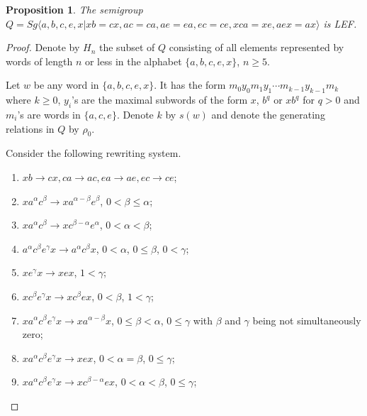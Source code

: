 \documentclass{article}
\newtheorem{proposition}{Proposition}
\theoremstyle{definition}
\begin{document}
\begin{proposition}
The semigroup $Q = Sg \langle a,b,c,e,x | xb = cx, ac = ca, ae=ea, ec=ce, xca = xe, aex = ax\rangle$ is LEF.
\end{proposition}
\begin{proof}
Denote by $H_n$ the subset of $Q$ consisting of all elements represented by words of length $n$ or less in the alphabet $\{a,b,c,e,x\}$, $n \ge 5$.

Let $w$ be any word in $\{a,b,c,e,x\}$. It has the form  $m_0 y_0 m_1 y_1 \cdots m_{k-1} y_{k-1} m_k$ where $k \ge 0$, $y_i$'s are the maximal subwords of the form $x$, $b^q$ or $x b^q$ for $q > 0$ and $m_i$'s are words in $\{a,c,e\}$. Denote $k$ by $s(w)$ and denote the generating relations in $Q$ by $\rho_0$.

Consider the following rewriting system.

\begin{enumerate}
\item $xb \rightarrow cx, ca \rightarrow ac, ea \rightarrow ae, ec \rightarrow ce$;

\item $x a^\alpha c^\beta \rightarrow x a^{\alpha - \beta} e^\beta$, $0< \beta \le \alpha$;
\item $x a^\alpha c^\beta \rightarrow x c^{\beta - \alpha} e^\alpha$, $0< \alpha < \beta$;

\item $ a^\alpha c^\beta e^\gamma x  \rightarrow a^\alpha c^\beta x $, $0<\alpha$, $0 \le \beta$, $0 < \gamma$;

\item $x e^\gamma x \rightarrow xex$, $1< \gamma$;
\item $x c^\beta e^\gamma x \rightarrow x c^{\beta} e x$, $0< \beta$, $1 <\gamma$;
\item $x a^\alpha c^\beta e^\gamma x \rightarrow x a^{\alpha - \beta} x$, $0\le \beta < \alpha$, $0\le \gamma$ with $\beta$ and $\gamma$ being not simultaneously zero;
\item $x a^\alpha c^\beta e^\gamma x\rightarrow x e x$, $0 <\alpha = \beta$, $0\le \gamma$;
\item $x a^\alpha c^\beta e^\gamma x\rightarrow x c^{\beta - \alpha} e x$, $0 <\alpha < \beta$, $0\le \gamma$;
\end{enumerate}


\end{proof}
\end{document}
